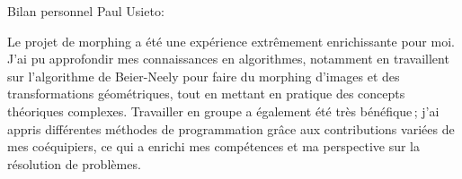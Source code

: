Bilan personnel Paul Usieto:

Le projet de morphing a été une expérience extrêmement enrichissante pour moi. J'ai pu approfondir mes connaissances en algorithmes, notamment en travaillent sur l’algorithme de Beier-Neely pour faire du morphing d’images et des transformations géométriques, tout en mettant en pratique des concepts théoriques complexes. Travailler en groupe a également été très bénéfique ; j'ai appris différentes méthodes de programmation grâce aux contributions variées de mes coéquipiers, ce qui a enrichi mes compétences et ma perspective sur la résolution de problèmes.
